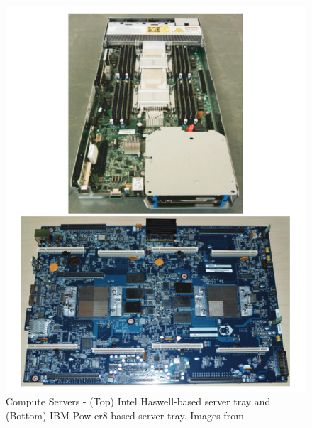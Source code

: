 \begin{figure} [!h]
\centering
\includegraphics[scale=.5]{methodology/images/server_image.png}
\caption[Barroso's Compute Servers]{Compute Servers - (Top) Intel Haswell-based server tray and (Bottom) IBM Pow-er8-based server tray.  Images from \cite{barroso13}}
\label{img_server}
\end{figure}